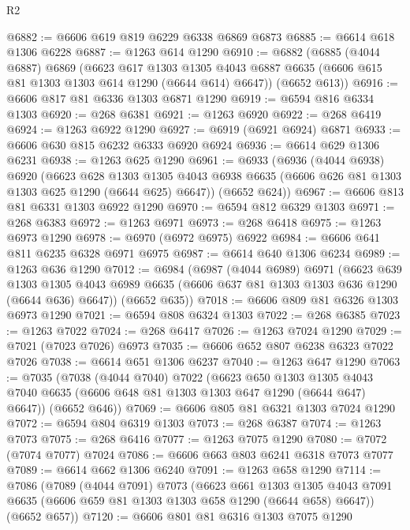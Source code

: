 \begin{lexlean}{R2}
\begin{coremodule}
@6882 := @6606 @619 @819 @6229 @6338 @6869 @6873
@6885 := @6614 @618 @1306 @6228
@6887 := @1263 @614 @1290
@6910 := @6882
    (@6885
      (@4044 @6887)
      @6869
      (@6623
        @617
        @1303
        @1305
        @4043
        @6887
        @6635
        (@6606 @615 @81 @1303 @1303 @614 @1290 (@6644 @614) @6647))
      (@6652 @613))
@6916 := @6606 @817 @81 @6336 @1303 @6871 @1290
@6919 := @6594 @816 @6334 @1303
@6920 := @268 @6381
@6921 := @1263 @6920
@6922 := @268 @6419
@6924 := @1263 @6922 @1290
@6927 := @6919 (@6921 @6924) @6871
@6933 := @6606 @630 @815 @6232 @6333 @6920 @6924
@6936 := @6614 @629 @1306 @6231
@6938 := @1263 @625 @1290
@6961 := @6933
    (@6936
      (@4044 @6938)
      @6920
      (@6623
        @628
        @1303
        @1305
        @4043
        @6938
        @6635
        (@6606 @626 @81 @1303 @1303 @625 @1290 (@6644 @625) @6647))
      (@6652 @624))
@6967 := @6606 @813 @81 @6331 @1303 @6922 @1290
@6970 := @6594 @812 @6329 @1303
@6971 := @268 @6383
@6972 := @1263 @6971
@6973 := @268 @6418
@6975 := @1263 @6973 @1290
@6978 := @6970 (@6972 @6975) @6922
@6984 := @6606 @641 @811 @6235 @6328 @6971 @6975
@6987 := @6614 @640 @1306 @6234
@6989 := @1263 @636 @1290
@7012 := @6984
    (@6987
      (@4044 @6989)
      @6971
      (@6623
        @639
        @1303
        @1305
        @4043
        @6989
        @6635
        (@6606 @637 @81 @1303 @1303 @636 @1290 (@6644 @636) @6647))
      (@6652 @635))
@7018 := @6606 @809 @81 @6326 @1303 @6973 @1290
@7021 := @6594 @808 @6324 @1303
@7022 := @268 @6385
@7023 := @1263 @7022
@7024 := @268 @6417
@7026 := @1263 @7024 @1290
@7029 := @7021 (@7023 @7026) @6973
@7035 := @6606 @652 @807 @6238 @6323 @7022 @7026
@7038 := @6614 @651 @1306 @6237
@7040 := @1263 @647 @1290
@7063 := @7035
    (@7038
      (@4044 @7040)
      @7022
      (@6623
        @650
        @1303
        @1305
        @4043
        @7040
        @6635
        (@6606 @648 @81 @1303 @1303 @647 @1290 (@6644 @647) @6647))
      (@6652 @646))
@7069 := @6606 @805 @81 @6321 @1303 @7024 @1290
@7072 := @6594 @804 @6319 @1303
@7073 := @268 @6387
@7074 := @1263 @7073
@7075 := @268 @6416
@7077 := @1263 @7075 @1290
@7080 := @7072 (@7074 @7077) @7024
@7086 := @6606 @663 @803 @6241 @6318 @7073 @7077
@7089 := @6614 @662 @1306 @6240
@7091 := @1263 @658 @1290
@7114 := @7086
    (@7089
      (@4044 @7091)
      @7073
      (@6623
        @661
        @1303
        @1305
        @4043
        @7091
        @6635
        (@6606 @659 @81 @1303 @1303 @658 @1290 (@6644 @658) @6647))
      (@6652 @657))
@7120 := @6606 @801 @81 @6316 @1303 @7075 @1290

\end{coremodule}
\end{lexlean}
